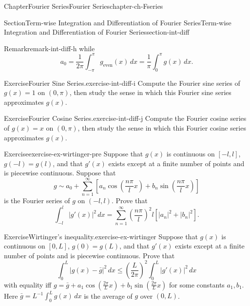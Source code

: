 \documentclass[oneside,10pt,]{book}
\numberwithin{equation}{section}
\begin{document}
\begin{chapterptx}{Chapter}{Fourier Series}{}{Fourier Series}{}{}{chapter-ch-Fseries}
\begin{sectionptx}{Section}{Term-wise Integration and Differentiation of Fourier Series}{}{Term-wise Integration and Differentiation of Fourier Series}{}{}{section-int-diff}
\begin{remark}{Remark}{}{remark-int-diff-h}
while%
\begin{equation*}
a_{0}=\frac {1}{2\pi} \int_{-\pi}^{\pi} g_{\text{even}}(x)\, dx= \frac 1\pi \int_{0}^{\pi} g(x)\, dx.
\end{equation*}
%
\end{remark}
\begin{inlineexercise}{Exercise}{Fourier Sine Series.}{exercise-int-diff-i}%
Compute the Fourier sine series of \(g(x)=1\) on \((0, \pi)\), then study the sense in which this Fourier sine series approximates \(g(x)\).%
\end{inlineexercise}%
\begin{inlineexercise}{Exercise}{Fourier Cosine Series.}{exercise-int-diff-j}%
Compute the Fourier cosine series of \(g(x)=x\) on \((0, \pi)\), then study the sense in which this Fourier cosine series approximates \(g(x)\).%
\end{inlineexercise}%
\begin{inlineexercise}{Exercise}{}{exercise-ex-wirtinger-pre}%
Suppose that  \(g(x)\) is continuous  on \([-l, l]\),  \(g(-l)=g(l)\), and that \(g'(x)\) exists except at a finite number of points and is piecewise continuous. Suppose that%
\begin{equation*}
g \sim a_0 +\sum_{n=1}^{\infty}\left[ a_n \cos  \left(\frac{n \pi}{l} x \right) + b_n \sin  \left(\frac{n \pi}{l} x \right) \right]
\end{equation*}
is the Fourier series of \(g\) on \((-l, l)\). Prove that%
\begin{equation*}
\int_{-l}^{l} |g'(x)|^{2} \, dx = \sum_{n=1}^{\infty} \left(\frac{n \pi}{l}  \right)^{2}l \left[ |a_n|^{2} + |b_n|^{2}\right].
\end{equation*}
%
\end{inlineexercise}%
\begin{inlineexercise}{Exercise}{Wirtinger's inequality.}{exercise-ex-wirtinger}%
Suppose that  \(g(x)\) is continuous  on \([0, L]\), \(g(0)=g(L)\), and that \(g'(x)\) exists except at a finite number of points and is piecewise continuous. Prove that%
\begin{equation}
\int_{0}^{L} |g(x)-\bar g|^{2} \, dx \le \left(\frac{L}{2\pi}\right)^{2} \int_{0}^{L} |g'(x)|^{2} \, dx\label{men-eq-wirtinger}
\end{equation}
with equality iff \(g=\bar g + a_{1}\cos \left(\frac{2\pi}{L} x \right) +b_{1} \sin \left(\frac{2\pi}{L} x \right)\) for some constants \(a_{1}, b_{1}\). Here \(\bar g =L^{-1} \int_{0}^{L} g(x)\, dx\) is the average of \(g\) over \((0, L)\).%
\end{inlineexercise}%

\end{sectionptx}
\end{chapterptx}
\end{document}
